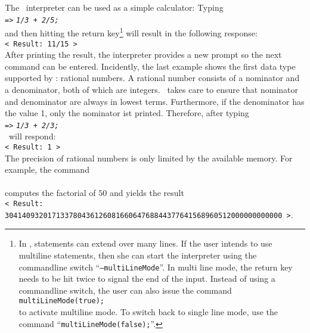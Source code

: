 \noindent
The \setlx\  interpreter can be used as a simple calculator:
Typing 
\\[0.2cm]
\hspace*{1.3cm}
\texttt{=>} \texttt{\textsl{1/3 + 2/5;}}
\\[0.2cm]
and then hitting the return key\footnote{
In \setlx, statements can extend over many lines.  If the user intends to use multiline
statements, then she can start the interpreter using the commandline switch ``\texttt{--multiLineMode}''.
In multi line mode, the return key needs to be hit twice to signal
the end of the input.  Instead of using a commandline switch, the user can also issue the command
\\
\hspace*{1.3cm}
\texttt{multiLineMode(true);}
\\
to activate multiline mode.
To switch back to single line mode, use the command ``\texttt{multiLineMode(false);}''.
} 
will result in the following response:
\\[0.2cm]
\hspace*{1.3cm}
\texttt{< Result: 11/15 >}
\\[0.2cm]
After printing the result, the interpreter provides a new prompt so the next command can
be entered.  Incidently, the last 
example shows the first data type supported by \setlx: rational numbers.  A rational number
consists of a nominator and a denominator, both of which are integers.  \setlx\ takes care to
ensure that nominator and denominator are always in lowest terms.  Furthermore, if the
denominator has the value 1, only the nominator ist printed.  Therefore, after typing
\\[0.2cm]
\hspace*{1.3cm}
\texttt{=>} \texttt{\textsl{1/3 + 2/3;}}
\\[0.2cm]
\setlx\ will respond:
\\[0.2cm]
\hspace*{1.3cm}
\texttt{< Result: 1 >}
\\[0.2cm]
The precision of rational numbers is only limited by the available memory.  For example, the command
\\[0.2cm]
\hspace*{1.3cm}
\\[0.2cm]
computes the factorial of $50$ and yields the result
\\[0.2cm]
\hspace*{0.1cm}
\texttt{< Result: 30414093201713378043612608166064768844377641568960512000000000000 >}.
